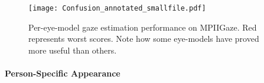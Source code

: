 
\begin{figure}
    \centering
    \texttt{[image: Confusion\_annotated\_smallfile.pdf]}
    \caption{Per-eye-model gaze estimation performance on MPIIGaze. Red represents worst scores. Note how some eye-models have proved more useful than others.  }
    \label{fig:person_specific_training}
\end{figure}


\paragraph{Person-Specific Appearance}

